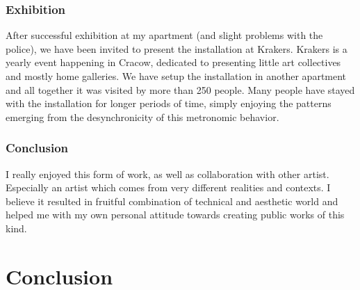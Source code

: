 \documentclass[11pt,a4paper,oneside]{report}
\begin{document}
\subsection{Exhibition} After successful exhibition at my apartment (and slight problems with the police), we have been invited to present the installation at Krakers. Krakers is a yearly event happening in Cracow, dedicated to presenting little art collectives and mostly home galleries. We have setup the installation in another apartment and all together it was visited by more than 250 people. Many people have stayed with the installation for longer periods of time, simply enjoying the patterns emerging from the desynchronicity of this metronomic behavior.

\subsection{Conclusion} I really enjoyed this form of work, as well as collaboration with other artist. Especially an artist which comes from very different realities and contexts. I believe it resulted in fruitful combination of technical and aesthetic world and helped me with my own personal attitude towards creating public works of this kind.

\chapter{Conclusion}

 

\end{document}

